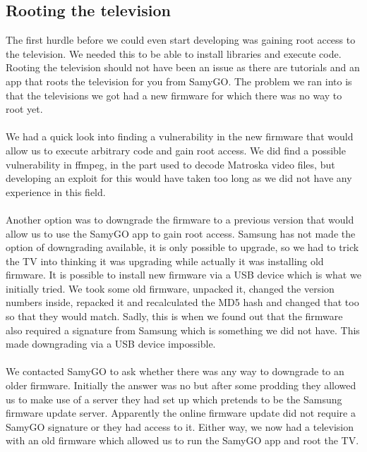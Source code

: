 \subsection{Rooting the television}
The first hurdle before we could even start developing was gaining root access to the television. We needed this to be able to install libraries and execute code. Rooting the television should not have been an issue as there are tutorials and an app that roots the television for you from SamyGO\cite{SamyGO}. The problem we ran into is that the televisions we got had a new firmware for which there was no way to root yet.
\\\\
We had a quick look into finding a vulnerability in the new firmware that would allow us to execute arbitrary code and gain root access. We did find a possible vulnerability in ffmpeg, in the part used to decode Matroska video files, but developing an exploit for this would have taken too long as we did not have any experience in this field.
\\\\
Another option was to downgrade the firmware to a previous version that would allow us to use the SamyGO app to gain root access. Samsung has not made the option of downgrading available, it is only possible to upgrade, so we had to trick the TV into thinking it was upgrading while actually it was installing old firmware. It is possible to install new firmware via a USB device which is what we initially tried. We took some old firmware, unpacked it, changed the version numbers inside, repacked it and recalculated the MD5 hash and changed that too so that they would match. Sadly, this is when we found out that the firmware also required a signature from Samsung which is something we did not have. This made downgrading via a USB device impossible.
\\\\
We contacted SamyGO to ask whether there was any way to downgrade to an older firmware. Initially the answer was no but after some prodding they allowed us to make use of a server they had set up which pretends to be the Samsung firmware update server. Apparently the online firmware update did not require a SamyGO signature or they had access to it. Either way, we now had a television with an old firmware which allowed us to run the SamyGO app and root the TV.

